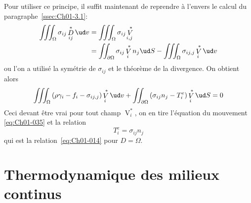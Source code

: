 Pour utiliser ce principe, il suffit maintenant de reprendre à l'envers le calcul du paragraphe~\ref{ssec:Ch01-3.1}:
\begin{align*}
    \iiint_{\Omega} \sigma_{ij} \mathop{D}^{\ast}_{ij} \ud v &= \iiint_{\Omega} \sigma_{ij} \mathop{V}^{\ast}_{i,j} \\
    &= \iint_{\partial \Omega} \sigma_{ij} \mathop{V}^{\ast}_{i} n_j \ud S - \iiint_{\Omega} \sigma_{ij,j} \mathop{V}^{\ast}_{i} \ud v
\end{align*}
ou l'on a utilisé la symétrie de $\sigma_{ij}$ et le théorème de la divergence.
On obtient alors
\begin{displaymath}
    \iiint_{\Omega} \left( \rho \gamma_i -f_i - \sigma_{ij,j} \right) \mathop{V}^{\ast}_i \ud v + \iint_{\partial \Omega} \left( \sigma_{ij} n_j - T_i^e \right) \mathop{V}^{\ast}_i \ud S = 0
\end{displaymath}
Ceci devant être vrai pour tout champ $\mathop{V}^{\ast}_i$, on en tire l'équation du mouvement \eqref{eq:Ch01-035} et la relation
\begin{equation}
    T_i^e = \sigma_{ij} n_j
    \label{eq:Ch01-039}
\end{equation}
qui est la relation~\eqref{eq:Ch01-014} pour $D=\Omega$. 

\section{Thermodynamique des milieux continus} \label{sec:Ch01-3}
